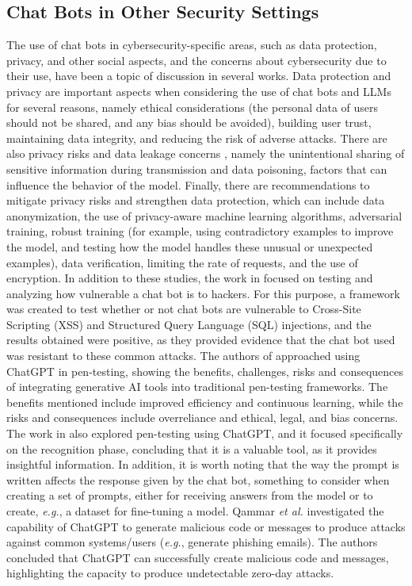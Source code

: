 \documentclass[sigconf]{acmart}
\begin{document}
\subsection{Chat Bots in Other Security Settings}
The use of chat bots in cybersecurity-specific areas, such as data protection, privacy, and other social aspects, and the concerns about cybersecurity due to their use, have been a topic of discussion in several works. Data protection and privacy are important aspects when considering the use of chat bots and LLMs \cite{Sebastian23} for several reasons, namely ethical considerations (the personal data of users should not be shared, and any bias should be avoided), building user trust, maintaining data integrity, and reducing the risk of adverse attacks. There are also privacy risks and data leakage concerns \cite{Hasal21}, namely the unintentional sharing of sensitive information during transmission and data poisoning, factors that can influence the behavior of the model. Finally, there are recommendations to mitigate privacy risks and strengthen data protection, which can include data anonymization, the use of privacy-aware machine learning algorithms, adversarial training, robust training (for example, using contradictory examples to improve the model, and testing how the model handles these unusual or unexpected examples), data verification, limiting the rate of requests, and the use of encryption. In addition to these studies, the work in \cite{Bozic18} focused on testing and analyzing how vulnerable a chat bot is to hackers. For this purpose, a framework was created to test whether or not chat bots are vulnerable to Cross-Site Scripting (XSS) and Structured Query Language (SQL) injections, and the results obtained were positive, as they provided evidence that the chat bot used was resistant to these common attacks. The authors of \cite{Hilario24} approached using ChatGPT in pen-testing, showing the benefits, challenges, risks and consequences of integrating generative AI tools into traditional pen-testing frameworks. The benefits mentioned include improved efficiency and continuous learning, while the risks and consequences include overreliance and ethical, legal, and bias concerns. The work in \cite{Temara23} also explored pen-testing using ChatGPT, and it focused specifically on the recognition phase, concluding that it is a valuable tool, as it provides insightful information. In addition, it is worth noting that the way the prompt is written affects the response given by the chat bot, something to consider when creating a set of prompts, either for receiving answers from the model or to create, \textit{e.g.}, a dataset for fine-tuning a model. Qammar \textit{et al.} \cite{Qammar23} investigated the capability of ChatGPT to generate malicious code or messages to produce attacks against common systems/users (\textit{e.g.}, generate phishing emails). The authors concluded that ChatGPT can successfully create malicious code and messages, highlighting the capacity to produce undetectable zero-day attacks.
\end{document}
